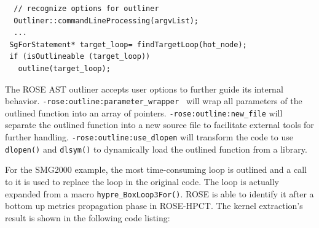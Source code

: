 {\mySmallFontSize
\begin{verbatim}
  // recognize options for outliner
  Outliner::commandLineProcessing(argvList);
  ...
 SgForStatement* target_loop= findTargetLoop(hot_node);
 if (isOutlineable (target_loop))  
   outline(target_loop);
\end{verbatim}
}

The ROSE AST outliner accepts user options to further guide its internal
behavior. \lstinline{-rose:outline:parameter_wrapper } will wrap all
parameters of the outlined function into an array of pointers. 
\lstinline{-rose:outline:new_file} will separate the outlined function into
a new source file to facilitate external tools for further handling.
\lstinline{-rose:outline:use_dlopen} will transform the code to use
\lstinline{dlopen()} and \lstinline{dlsym()} to dynamically load the
outlined function from a library.

For the SMG2000 example, the most time-consuming loop is outlined and a call to it is used
to replace the loop in the original code. 
The loop is actually expanded from a macro
\lstinline{hypre_BoxLoop3For()}. 
ROSE is able to identify it after a bottom
up metrics propagation phase in ROSE-HPCT. 
The kernel extraction's result is shown in the following code listing:



